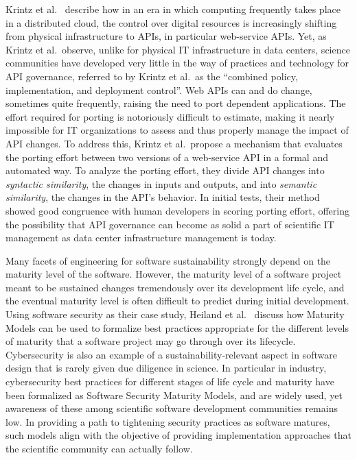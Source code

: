 \documentclass[11pt, oneside]{amsart}
\begin{document}
Krintz et al.~\cite{Krintz_WSSSPE} describe how in an era in which
computing frequently takes place in a distributed cloud, the control
over digital resources is increasingly shifting from physical
infrastructure to APIs, in particular web-service APIs. Yet, as Krintz
et al.~observe, unlike for physical IT infrastructure in data centers,
science communities have developed very little in the way of practices
and technology for API governance, referred to by Krintz et al.~as the
``combined policy, implementation, and deployment control''. Web APIs
can and do change, sometimes quite frequently, raising the need to
port dependent applications. The effort required for porting is
notoriously difficult to estimate, making it nearly impossible for IT
organizations to assess and thus properly manage the impact of API
changes. To address this, Krintz et al.~propose a mechanism that
evaluates the porting effort between two versions of a web-service API
in a formal and automated way. To analyze the porting effort, they
divide API changes into \emph{syntactic similarity}, the changes in
inputs and outputs, and into \emph{semantic similarity}, the changes
in the API's behavior. In initial tests, their method showed good
congruence with human developers in scoring porting effort, offering
the possibility that API governance can become as solid a part of
scientific IT management as data center infrastructure management is
today.

Many facets of engineering for software sustainability strongly depend
on the maturity level of the software. However, the maturity level of
a software project meant to be sustained changes tremendously over its
development life cycle, and the eventual maturity level is often
difficult to predict during initial development. Using software
security as their case study, Heiland et al.~\cite{Heiland_WSSSPE}
discuss how Maturity Models can be used to formalize best practices
appropriate for the different levels of maturity that a software
project may go through over its lifecycle. Cybersecurity is also an
example of a sustainability-relevant aspect in software design that is
rarely given due diligence in science. In particular in industry,
cybersecurity best practices for different stages of life cycle and
maturity have been formalized as Software Security Maturity Models,
and are widely used, yet awareness of these among scientific software
development communities remains low. In providing a path to tightening
security practices as software matures, such models align with the
objective of providing implementation approaches that the scientific
community can actually follow.
\end{document}
